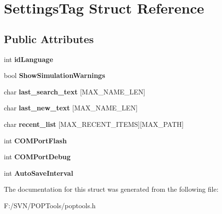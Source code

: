 \hypertarget{struct_settings_tag}{\section{Settings\-Tag Struct Reference}
\label{struct_settings_tag}
}
\subsection*{Public Attributes}
\begin{DoxyCompactItemize}
\item 
\hypertarget{struct_settings_tag_a32e099c28c8887f3aad0b8623a87f39a}{int {\bfseries id\-Language}}\label{struct_settings_tag_a32e099c28c8887f3aad0b8623a87f39a}

\item 
\hypertarget{struct_settings_tag_a9b7e35057cd81dfae66531a230d95913}{bool {\bfseries Show\-Simulation\-Warnings}}\label{struct_settings_tag_a9b7e35057cd81dfae66531a230d95913}

\item 
\hypertarget{struct_settings_tag_a1aaef4f8ab448354a47a94c9c3abbe22}{char {\bfseries last\-\_\-search\-\_\-text} \mbox{[}M\-A\-X\-\_\-\-N\-A\-M\-E\-\_\-\-L\-E\-N\mbox{]}}\label{struct_settings_tag_a1aaef4f8ab448354a47a94c9c3abbe22}

\item 
\hypertarget{struct_settings_tag_af95166ddb73be7e89ca26e4a0538e271}{char {\bfseries last\-\_\-new\-\_\-text} \mbox{[}M\-A\-X\-\_\-\-N\-A\-M\-E\-\_\-\-L\-E\-N\mbox{]}}\label{struct_settings_tag_af95166ddb73be7e89ca26e4a0538e271}

\item 
\hypertarget{struct_settings_tag_a35af5abb34c1b3dfc2bc59ff966cb2e8}{char {\bfseries recent\-\_\-list} \mbox{[}M\-A\-X\-\_\-\-R\-E\-C\-E\-N\-T\-\_\-\-I\-T\-E\-M\-S\mbox{]}\mbox{[}M\-A\-X\-\_\-\-P\-A\-T\-H\mbox{]}}\label{struct_settings_tag_a35af5abb34c1b3dfc2bc59ff966cb2e8}

\item 
\hypertarget{struct_settings_tag_a4311cc5ebdea4c4037d3a5f6a0ac1782}{int {\bfseries C\-O\-M\-Port\-Flash}}\label{struct_settings_tag_a4311cc5ebdea4c4037d3a5f6a0ac1782}

\item 
\hypertarget{struct_settings_tag_a929f488648aacb5c51ae2037a4439882}{int {\bfseries C\-O\-M\-Port\-Debug}}\label{struct_settings_tag_a929f488648aacb5c51ae2037a4439882}

\item 
\hypertarget{struct_settings_tag_ab21be9e507245ffbf49818dce9a3c349}{int {\bfseries Auto\-Save\-Interval}}\label{struct_settings_tag_ab21be9e507245ffbf49818dce9a3c349}

\end{DoxyCompactItemize}


The documentation for this struct was generated from the following file\-:\begin{DoxyCompactItemize}
\item 
F\-:/\-S\-V\-N/\-P\-O\-P\-Tools/poptools.\-h\end{DoxyCompactItemize}
